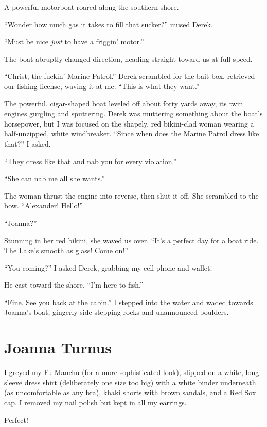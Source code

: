 A powerful motorboat roared along the southern shore.

``Wonder how much gas it takes to fill that sucker?'' mused Derek.

``Must be nice \emph{just} to have a friggin' motor.''

The boat abruptly changed direction, heading straight toward us at full
speed.

``Christ, the fuckin' Marine Patrol.'' Derek scrambled for the bait box,
retrieved our fishing license, waving it at me. ``This is what they
want.''

The powerful, cigar-shaped boat leveled off about forty yards away, its
twin engines gurgling and sputtering. Derek was muttering something
about the boat's horsepower, but I was focused on the shapely, red
bikini-clad woman wearing a half-unzipped, white windbreaker. ``Since
when does the Marine Patrol dress like that?'' I asked.

``They dress like that and nab you for every violation.''

``She can nab me all she wants.''

The woman thrust the engine into reverse, then shut it off. She
scrambled to the bow. ``Alexander! Hello!''

``Joanna?''

Stunning in her red bikini, she waved us over. ``It's a perfect day for
a boat ride. The Lake's smooth as glass! Come on!''

``You coming?'' I asked Derek, grabbing my cell phone and wallet.

He cast toward the shore. ``I'm here to fish.''

``Fine. See you back at the cabin.'' I stepped into the water and waded
towards Joanna's boat, gingerly side-stepping rocks and unannounced
boulders.

\chapter{Joanna Turnus}

\titlemark

I greyed my Fu Manchu (for a more sophisticated look), slipped on a
white, long-sleeve dress shirt (deliberately one size too big) with a
white binder underneath (as uncomfortable as any bra), khaki shorts with
brown sandals, and a Red Sox cap. I removed my nail polish but kept in
all my earrings.

Perfect!

